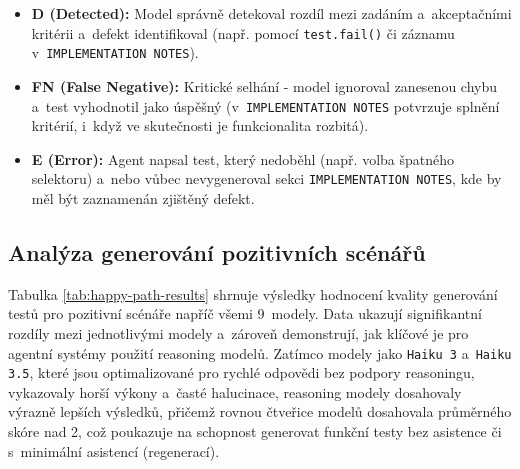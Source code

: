 \documentclass[czech, ing, kiv, he, iso690numb, viewonly]{fasthesis}
\begin{document}
\begin{itemize}
    \item \textbf{D (Detected):} Model správně detekoval rozdíl mezi zadáním a~akceptačními kritérii a~defekt identifikoval (např. pomocí \texttt{test.fail()} či záznamu v~\texttt{IMPLEMENTATION NOTES}).
    \item \textbf{FN (False Negative):} Kritické selhání - model ignoroval zanesenou chybu 
    a~test vyhodnotil jako úspěšný (v~\texttt{IMPLEMENTATION NOTES} potvrzuje splnění kritérií, 
    i~když ve skutečnosti je funkcionalita rozbitá).
    \item \textbf{E (Error):} Agent napsal test, který nedoběhl (např. volba špatného selektoru) a~nebo
    vůbec nevygeneroval sekci \texttt{IMPLEMENTATION NOTES}, kde by měl být zaznamenán zjištěný defekt.
\end{itemize}


\subsection{Analýza generování pozitivních scénářů}

Tabulka \ref{tab:happy-path-results} shrnuje výsledky hodnocení kvality
generování testů pro pozitivní scénáře napříč všemi 9~modely. 
Data ukazují signifikantní rozdíly mezi jednotlivými modely a~zároveň demonstrují,
jak klíčové je pro agentní systémy použití reasoning modelů. Zatímco
modely jako \texttt{Haiku 3} a~\texttt{Haiku 3.5}, které jsou optimalizované pro rychlé odpovědi 
bez podpory reasoningu, vykazovaly horší výkony a~časté halucinace,
reasoning modely dosahovaly výrazně lepších výsledků,
přičemž rovnou čtveřice modelů dosahovala průměrného skóre nad 2, což poukazuje na 
schopnost generovat funkční testy bez asistence či s~minimální asistencí (regenerací).
\end{document}
